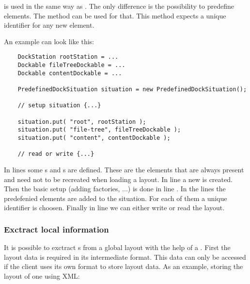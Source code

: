 
 is used in the same way as . The only difference is the possibility to predefine elements. The method  can be used for that. This method expects a unique identifier for any new element.

An example can look like this:
\begin{lstlisting}
	DockStation rootStation = ...
	Dockable fileTreeDockable = ...
	Dockable contentDockable = ...

	PredefinedDockSituation situation = new PredefinedDockSituation();

	// setup situation {...}

	situation.put( "root", rootStation );
	situation.put( "file-tree", fileTreeDockable );
	situation.put( "content", contentDockable );

	// read or write {...}
\end{lstlisting}
In lines  some s and s are defined. These are the elements that are always present and need not to be recreated when loading a layout. In line  a new  is created. Then the basic setup (adding factories, ...) is done in line . In the lines  the predefenied elements are added to the situation. For each of them a unique identifier is choosen. Finally in line  we can either write or read the layout.


\subsubsection{Exctract local information}
It is possible to exctract s from a global layout with the help of a . First the layout data is required in its intermediate format. This data can only be accessed if the client uses its own format to store layout data. As an example, storing the layout of one  using XML:

